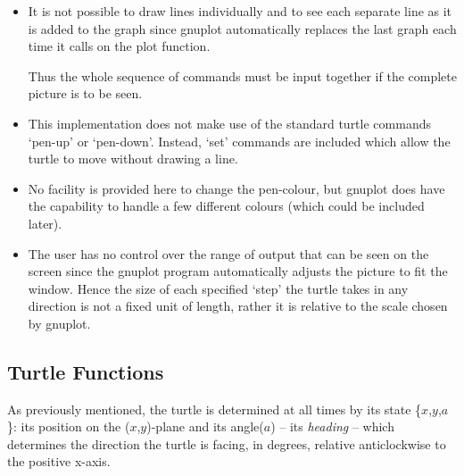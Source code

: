 \begin{itemize}
 \item It is not possible to draw lines individually and to see each
        separate line as it is added to the graph since gnuplot
        automatically replaces the last graph each time it calls on
        the plot function.

       Thus the whole sequence of commands must be input together if
        the complete picture is to be seen.
 \item This implementation does not make use of the standard turtle
        commands `pen-up' or `pen-down'. Instead, `set' commands are
        included which allow the turtle to move without drawing a line.
 \item No facility is provided here to change the pen-colour, but gnuplot
        does have the capability to handle a few different colours (which
        could be included later).
\iffalse
 \item Many of the commands are long and difficult to type out repeatedly,
        therefore all the commands included under \emph{`Turtle Functions'}
        (below) are listed alongside an equivalent abbreviated form.
\fi
 \item The user has no control over the range of output that can be seen
        on the screen since the gnuplot program automatically adjusts the
        picture to fit the window. Hence the size of each specified `step'
        the turtle takes in any direction is not a fixed unit of length,
        rather it is relative to the scale chosen by gnuplot.
\end{itemize}


\subsection{Turtle Functions}
 As previously mentioned, the turtle is determined at all times by its
state \{$x$,$y$,$a$\}: its position on the \mbox{($x$,$y$)-plane} and its
angle($a$) -- its \emph{heading} -- which determines the direction the
turtle is facing, in degrees, relative anticlockwise to the positive
x-axis.

